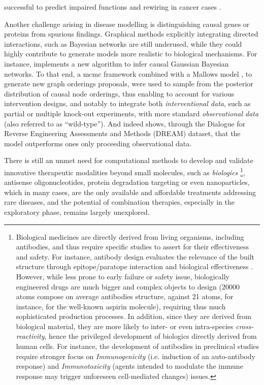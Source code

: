\documentclass[mainlanguage=english,numlaboratories=2, nofrontcover=true,noaim=false, localbibs, colophon-location=verso-frontcover, oneside, 10pt, localtocs, version=final, nomakeabstract=true]{yathesis}
\begin{document}
successful to predict impaired functions and rewiring in cancer cases \autocite{doria-belenguer_etal23}.

Another challenge arising in disease modelling is distinguishing causal genes or proteins from spurious findings. Graphical methods explicitly integrating directed interactions, such as Bayesian networks \autocite{luo_etal20} \autocite{needham_etal06} are still underused, while they could highly contribute to generate models more realistic to biological mechanisms. For instance, \autocite{rau_etal13} implements a new algorithm to infer causal Gaussian Bayesian networks. To that end, a \acrfull{mcmc} framework combined with a Mallows model \autocite{mallows57}, to generate new graph orderings proposals, were used to sample from the posterior distribution of causal node orderings, thus enabling to account for various intervention designs, and notably to integrate both \emph{interventional data}, such as partial or multiple knock-out experiments, with more standard \emph{observational data} (also referred to as \enquote{wild-type}). And \autocite{needham_etal06} indeed shows, through the Dialogue for Reverse Engineering Assessments and Methods (DREAM) dataset, that the model outperforms ones only proceeding observational data.

There is still an unmet need for computational methods to develop and validate innovative therapeutic modalities beyond small molecules, such as \emph{biologics} \footnote{Biological medicines are directly derived from living organisms, including antibodies, and thus require specific studies to assert for their effectiveness and safety. For instance, antibody design evaluates the relevance of the built structure through epitope/paratope interaction and biological effectiveness \autocite{bennett_etal14}. However, while less prone to early failure or safety issue, biologically engineered drugs are much bigger and complex objects to design (\num{20000} atoms compose on average antibodies structure, against 21 atoms, for instance, for the well-known aspirin molecule), requiring thus much sophisticated production processes. In addition, since they are derived from biological material, they are more likely to inter- or even intra-species \emph{cross-reactivity}, hence the privileged development of biologics directly derived from human cells. For instance, the development of antibodies in preclinical studies require stronger focus on \emph{Immunogenicity} (i.e. induction of an auto-antibody response) and \emph{Immunotoxicity} (agents intended to modulate
the immune response may trigger unforeseen cell-mediated changes) issues.}, antisense oligonucleotides, protein degradation targeting or even nanoparticles, which in many cases, are the only available and affordable treatments addressing rare diseases, and the potential of combination therapies, especially in the exploratory phase, remains largely unexplored.
\end{document}
